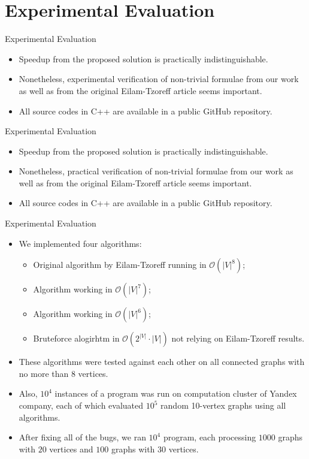 \documentclass{beamer}
\newcommand{\OO}{\mathcal{O}}
\begin{document}
\section{Experimental Evaluation}

\begin{frame}{Experimental Evaluation}
    \begin{itemize}
        \item Speedup from the proposed solution is practically indistinguishable.
        \item Nonetheless, experimental verification of non-trivial formulae from our work as well as from the original Eilam-Tzoreff article seems important.
        \item All source codes in C++ are available in a public GitHub repository.
    \end{itemize}
\end{frame}

\begin{frame}{Experimental Evaluation}
    \begin{itemize}
        \item Speedup from the proposed solution is practically indistinguishable.
        \item Nonetheless, practical verification of non-trivial formulae from our work as well as from the original Eilam-Tzoreff article seems important.
        \item All source codes in C++ are available in a public GitHub repository.
    \end{itemize}
\end{frame}

\begin{frame}{Experimental Evaluation}
    \begin{itemize}
        \item We implemented four algorithms:
        \begin{itemize}
            \item Original algorithm by Eilam-Tzoreff running in $\OO(|V|^8)$;
            \item Algorithm working in $\OO(|V|^7)$;
            \item Algorithm working in $\OO(|V|^6)$;
            \item Bruteforce alogirhtm in $\OO(2^{|V|} \cdot |V|)$ not relying on Eilam-Tzoreff results.
        \end{itemize}
        \item These algorithms were tested against each other on all connected graphs with no more than 8 vertices.
        \item Also, $10^4$ instances of a program was run on computation cluster of Yandex company, each of which evaluated $10^5$ random 10-vertex graphs using all algorithms.
        \item After fixing all of the bugs, we ran $10^4$ program, each processing $1000$ graphs with $20$ vertices and $100$ graphs with $30$ vertices.
    \end{itemize}
\end{frame}
\end{document}
